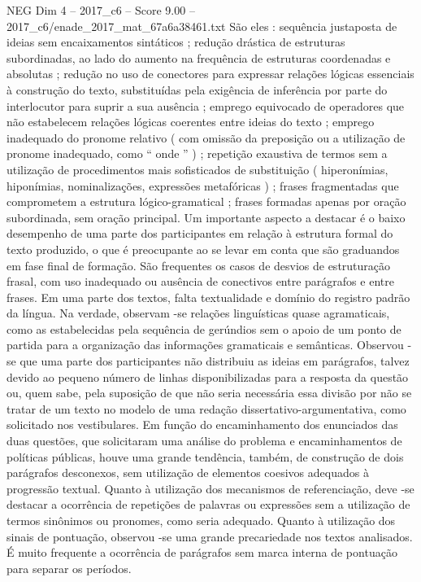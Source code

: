\begin{textsample}{NEG Dim 4 – 2017\_c6 – Score 9.00 – 2017\_c6/enade\_2017\_mat\_67a6a38461.txt}
São eles : sequência justaposta de ideias sem encaixamentos sintáticos ; redução drástica de estruturas subordinadas, ao lado do aumento na frequência de estruturas coordenadas e absolutas ; redução no uso de conectores para expressar relações lógicas essenciais à construção do texto, substituídas pela exigência de inferência por parte do interlocutor para suprir a sua ausência ; emprego equivocado de operadores que não estabelecem relações lógicas coerentes entre ideias do texto ; emprego inadequado do pronome relativo ( com omissão da preposição ou a utilização de pronome inadequado, como “ onde ” ) ; repetição exaustiva de termos sem a utilização de procedimentos mais sofisticados de substituição ( hiperonímias, hiponímias, nominalizações, expressões metafóricas ) ; frases fragmentadas que comprometem a estrutura lógico-gramatical ; frases formadas apenas por oração subordinada, sem oração principal.
Um importante aspecto a destacar é o baixo desempenho de uma parte dos participantes em relação à estrutura formal do texto produzido, o que é preocupante ao se levar em conta que são graduandos em fase final de formação.
São frequentes os casos de desvios de estruturação frasal, com uso inadequado ou ausência de conectivos entre parágrafos e entre frases.
Em uma parte dos textos, falta textualidade e domínio do registro padrão da língua.
Na verdade, observam -se relações linguísticas quase agramaticais, como as estabelecidas pela sequência de gerúndios sem o apoio de um ponto de partida para a organização das informações gramaticais e semânticas.
Observou -se que uma parte dos participantes não distribuiu as ideias em parágrafos, talvez devido ao pequeno número de linhas disponibilizadas para a resposta da questão ou, quem sabe, pela suposição de que não seria necessária essa divisão por não se tratar de um texto no modelo de uma redação dissertativo-argumentativa, como solicitado nos vestibulares.
Em função do encaminhamento dos enunciados das duas questões, que solicitaram uma análise do problema e encaminhamentos de políticas públicas, houve uma grande tendência, também, de construção de dois parágrafos desconexos, sem utilização de elementos coesivos adequados à progressão textual.
Quanto à utilização dos mecanismos de referenciação, deve -se destacar a ocorrência de repetições de palavras ou expressões sem a utilização de termos sinônimos ou pronomes, como seria adequado.
Quanto à utilização dos sinais de pontuação, observou -se uma grande precariedade nos textos analisados.
É muito frequente a ocorrência de parágrafos sem marca interna de pontuação para separar os períodos.

\end{textsample}
